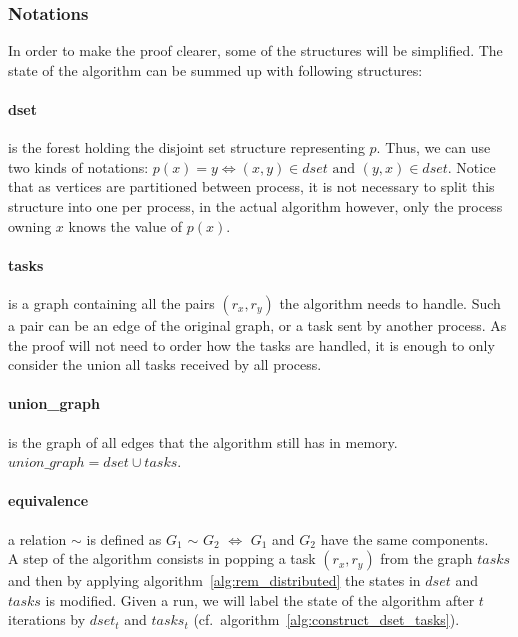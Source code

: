 \documentclass[12px]{article}
\begin{document}
      \subsubsection{Notations}
        In order to make the proof clearer, some of the structures will be simplified. The state of the algorithm can be summed up with following structures:

        \paragraph{dset} is the forest holding the disjoint set structure representing $p$. Thus, we can use two kinds of notations: $p(x) = y \Leftrightarrow (x, y) \in dset \text{ and } (y, x) \in dset$. Notice that as vertices are partitioned between process, it is not necessary to split this structure into one per process, in the actual algorithm however, only the process owning $x$ knows the value of $p(x)$.

        \paragraph{tasks} is a graph containing all the pairs $(r_x, r_y)$ the algorithm needs to handle. Such a pair can be an edge of the original graph, or a task sent by another process. As the proof will not need to order how the tasks are handled, it is enough to only consider the union all tasks received by all process.

        \paragraph{union\_graph} is the graph of all edges that the algorithm still has in memory. $union\_graph = dset \cup tasks$.

        \paragraph{equivalence} a relation $\sim$ is defined as $G_1$ $\sim$ $G_2$ $\Leftrightarrow$ $G_1$ and $G_2$ have the same components. \\

        A step of the algorithm consists in popping a task $(r_x, r_y)$ from the graph $tasks$ and then by applying
        algorithm~\ref{alg:rem_distributed} the states in $dset$ and $tasks$ is modified.
        Given a run, we will label the state of the algorithm after $t$ iterations by $dset_t$ and $tasks_t$ (cf.\ algorithm~\ref{alg:construct_dset_tasks}).
\end{document}
